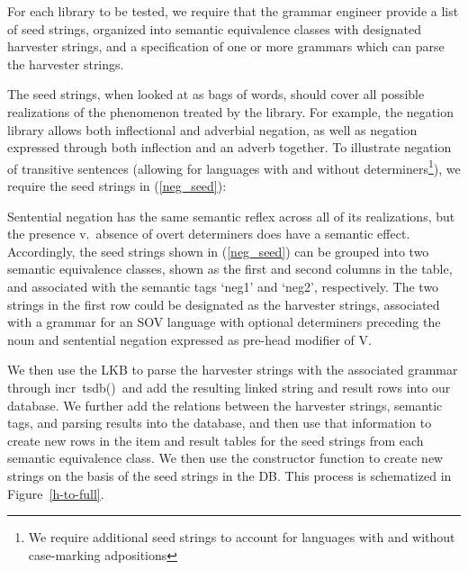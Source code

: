 \documentclass[11pt]{article}
\newcommand{\itsdb}{\mbox{\sf \lbrack incr tsdb()\rbrack}}
\begin{document}
For each library to be tested, we require that the grammar engineer
provide a list of seed strings, organized into semantic equivalence
classes with designated harvester strings, and a specification of one
or more grammars which can parse the harvester strings.

The seed strings, when looked at as bags of words, should cover all
possible realizations of the phenomenon treated by the library. For
example, the negation library allows both inflectional and adverbial
negation, as well as negation expressed through both inflection and an
adverb together.  To illustrate negation of transitive sentences
(allowing for languages with and without determiners\footnote{We
require additional seed strings to account for languages with and
without case-marking adpositions}), we require the seed strings in
(\ref{neg_seed}):

%
Sentential negation has the same semantic reflex across all
of its realizations, but the presence v.\ absence of overt determiners
does have a semantic effect.  Accordingly, the seed strings shown in
(\ref{neg_seed}) can be grouped into two semantic equivalence classes,
shown as the first and second columns in the table, and associated with
the semantic tags `neg1' and `neg2', respectively.  The two strings
in the first row could be designated as the harvester strings, associated
with a grammar for an SOV language with optional determiners preceding
the noun and sentential negation expressed as pre-head modifier of V.

We then use the LKB to parse the harvester strings with the associated
grammar through \itsdb\ and add the resulting linked string and 
result rows into our database.  We further add the relations between the
harvester strings, semantic tags, and parsing results into the database,
and then use that information to create new rows in the item and result tables
for the seed strings from each semantic equivalence class.   We then
use the constructor function to create new strings on the basis of
the seed strings in the DB.  This process is schematized in Figure~\ref{h-to-full}.
\end{document}
